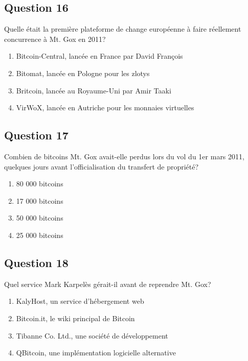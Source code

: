 \documentclass[12pt,a4paper]{article}
\begin{document}
\bigskip


\subsection*{Question 16}
Quelle était la première plateforme de change européenne à faire réellement concurrence à Mt. Gox en 2011?

\begin{enumerate}[label=\Alph*., leftmargin=*]
\item Bitcoin-Central, lancée en France par David François
\item Bitomat, lancée en Pologne pour les zlotys
\item Britcoin, lancée au Royaume-Uni par Amir Taaki
\item VirWoX, lancée en Autriche pour les monnaies virtuelles
\end{enumerate}

\bigskip


\subsection*{Question 17}
Combien de bitcoins Mt. Gox avait-elle perdus lors du vol du 1er mars 2011, quelques jours avant l'officialisation du transfert de propriété?

\begin{enumerate}[label=\Alph*., leftmargin=*]
\item 80 000 bitcoins
\item 17 000 bitcoins
\item 50 000 bitcoins
\item 25 000 bitcoins
\end{enumerate}

\bigskip


\subsection*{Question 18}
Quel service Mark Karpelès gérait-il avant de reprendre Mt. Gox?

\begin{enumerate}[label=\Alph*., leftmargin=*]
\item KalyHost, un service d'hébergement web
\item Bitcoin.it, le wiki principal de Bitcoin
\item Tibanne Co. Ltd., une société de développement
\item QBitcoin, une implémentation logicielle alternative
\end{enumerate}
\end{document}
